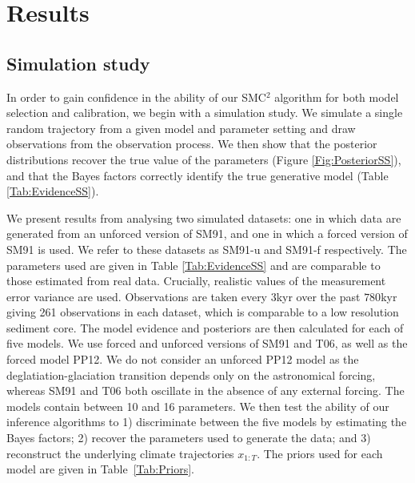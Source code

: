 \documentclass[a4paper,12pt]{article}
\begin{document}
%
%
%
%
%



\clearpage
\section{Results}
\label{Sec:Results}




\subsection{Simulation study}
In order to gain confidence in the ability of our SMC$^2$ algorithm for both model selection and calibration, we begin with a simulation study.
We simulate a single random trajectory from a given model and parameter setting and draw observations from the observation process. We then show that the posterior distributions recover the true value of the parameters (Figure \ref{Fig:PosteriorSS}), and that the Bayes factors correctly identify the true generative model (Table \ref{Tab:EvidenceSS}).

We present results from analysing two simulated datasets: one in which data are generated from an unforced version of SM91, and one in which a forced version of SM91 is used. 
We refer to these datasets as SM91-u and SM91-f respectively. The parameters used are given in Table \ref{Tab:EvidenceSS} and are comparable to those estimated from real data. Crucially, realistic values of the measurement error variance are used. 
Observations are taken every $3$kyr over the past $780$kyr giving 261 observations in each dataset, which  is comparable to a  low resolution sediment core.
The model evidence and posteriors are then calculated for  each of five models. We use  forced and unforced versions of SM91 and T06, as well as the forced model PP12. We do not consider an unforced PP12 model as the deglatiation-glaciation transition depends only on the astronomical forcing, whereas SM91 and T06 both oscillate in the absence of any external forcing. The models contain between 10 and 16 parameters. We then test the ability of  our inference algorithms to 1) discriminate between the five models by  estimating  the Bayes factors; 2) recover the parameters used to generate the data; and 3) reconstruct the underlying climate trajectories $x_{1:T}$.
The priors used for each model are given in Table~\ref{Tab:Priors}.
\end{document}
